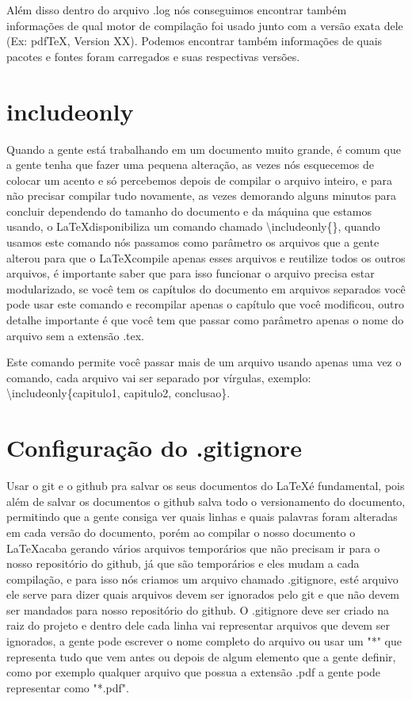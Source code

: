 Além disso dentro do arquivo .log nós conseguimos encontrar também informações de qual motor de compilação foi usado junto com a versão exata dele (Ex: pdfTeX, Version XX). Podemos encontrar também informações de quais pacotes e fontes foram carregados e suas respectivas versões.

\section{includeonly}
Quando a gente está trabalhando em um documento muito grande, é comum que a gente tenha que fazer uma pequena alteração, as vezes nós esquecemos de colocar um acento e só percebemos depois de compilar o arquivo inteiro, e para não precisar compilar tudo novamente, as vezes demorando alguns minutos para concluir dependendo do tamanho do documento e da máquina que estamos usando, o \LaTeX disponibiliza um comando chamado \textbackslash includeonly\{\}, quando usamos este comando nós passamos como parâmetro os arquivos que a gente alterou para que o \LaTeX compile apenas esses arquivos e reutilize todos os outros arquivos, é importante saber que para isso funcionar o arquivo precisa estar modularizado, se você tem os capítulos do documento em arquivos separados você pode usar este comando e recompilar apenas o capítulo que você modificou, outro detalhe importante é que você tem que passar como parâmetro apenas o nome do arquivo sem a extensão .tex.

Este comando permite você passar mais de um arquivo usando apenas uma vez o comando, cada arquivo vai ser separado por vírgulas, exemplo: \textbackslash includeonly\{capitulo1, capitulo2, conclusao\}.

\section{Configuração do .gitignore}

Usar o git e o github pra salvar os seus documentos do \LaTeX é fundamental, pois além de salvar os documentos o github salva todo o versionamento do documento, permitindo que a gente consiga ver quais linhas e quais palavras foram alteradas em cada versão do documento, porém ao compilar o nosso documento o \LaTeX acaba gerando vários arquivos temporários que não precisam ir para o nosso repositório do github, já que são temporários e eles mudam a cada compilação, e para isso nós criamos um arquivo chamado .gitignore, esté arquivo ele serve para dizer quais arquivos devem ser ignorados pelo git e que não devem ser mandados para nosso repositório do github. O .gitignore deve ser criado na raiz do projeto e dentro dele cada linha vai representar arquivos que devem ser ignorados, a gente pode escrever o nome completo do arquivo ou usar um "*" que representa tudo que vem antes ou depois de algum elemento que a gente definir, como por exemplo qualquer arquivo que possua a extensão .pdf a gente pode representar como "*.pdf".

